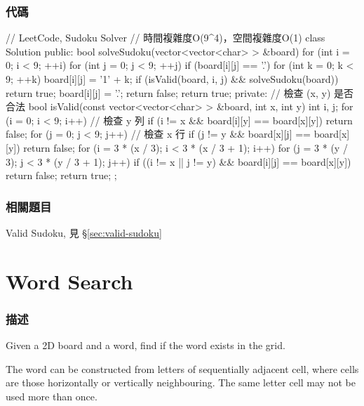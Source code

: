 \subsubsection{代碼}
\begin{Code}
// LeetCode, Sudoku Solver
// 時間複雜度O(9^4)，空間複雜度O(1)
class Solution {
public:
    bool solveSudoku(vector<vector<char> > &board) {
        for (int i = 0; i < 9; ++i)
            for (int j = 0; j < 9; ++j) {
                if (board[i][j] == '.') {
                    for (int k = 0; k < 9; ++k) {
                        board[i][j] = '1' + k;
                        if (isValid(board, i, j) && solveSudoku(board))
                            return true;
                        board[i][j] = '.';
                    }
                    return false;
                }
            }
        return true;
    }
private:
    // 檢查 (x, y) 是否合法
    bool isValid(const vector<vector<char> > &board, int x, int y) {
        int i, j;
        for (i = 0; i < 9; i++) // 檢查 y 列
            if (i != x && board[i][y] == board[x][y])
                return false;
        for (j = 0; j < 9; j++) // 檢查 x 行
            if (j != y && board[x][j] == board[x][y])
                return false;
        for (i = 3 * (x / 3); i < 3 * (x / 3 + 1); i++)
            for (j = 3 * (y / 3); j < 3 * (y / 3 + 1); j++)
                if ((i != x || j != y) && board[i][j] == board[x][y])
                    return false;
        return true;
    }
};
\end{Code}


\subsubsection{相關題目}
\begindot
\item Valid Sudoku, 見 \S \ref{sec:valid-sudoku}
\myenddot


\section{Word Search} %
\label{sec:word-search}


\subsubsection{描述}
Given a 2D board and a word, find if the word exists in the grid.

The word can be constructed from letters of sequentially adjacent cell, where  cells are those horizontally or vertically neighbouring. The same letter cell may not be used more than once.

